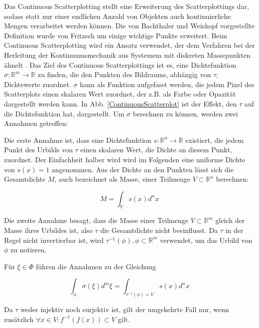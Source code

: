 \documentclass[a4paper,fontsize=12pt,toc=bib,halfparskip]{scrartcl}
\begin{document}
Das Continuous Scatterplotting stellt eine Erweiterung des Scatterplottings dar, sodass statt nur einer endlichen Anzahl von Objekten auch kontinuierliche Mengen verarbeitet werden k\"onnen. Die von Bachthaler und Weiskopf\cite{bachthaler2008continuous} vorgestellte Definition wurde von Fritzsch\cite{fritzsch2016continuousScatterplot} um einige wichtige Punkte erweitert. Beim Continuous Scatterplotting wird ein Ansatz verwendet, der dem Verfahren bei der Herleitung der Kontinuumsmechanik aus Systemem mit diskreten Massepunkten \"ahnelt \cite[S.~1429]{bachthaler2008continuous}. Das Ziel des Continuous Scatterplottings ist es, eine Dichtefunktion $\sigma: \mathbb{R}^m \rightarrow \mathbb{R}$ zu finden, die den Punkten des Bildraums, abh\"angig von $\tau$, Dichtewerte zuordnet. $\sigma$ kann als Funktion aufgefasst werden, die jedem Pixel des Scatterplots einen skalaren Wert zuordnet, der z.B. als Farbe oder Opazit\"at dargestellt werden kann. In Abb. \ref{ContinuousScatterplot} ist der Effekt, den $\tau$ auf die Dichtefunktion hat, dargestellt. Um $\sigma$ berechnen zu k\"onnen, werden zwei Annahmen getroffen:

Die erste Annahme ist, dass eine Dichtefunktion $s: \mathbb{R}^n \rightarrow \mathbb{R}$ existiert, die jedem Punkt des Urbilds von $\tau$ einen skalaren Wert, die Dichte an diesem Punkt, zuordnet. Der Einfachheit halber wird wird im Folgenden eine uniforme Dichte von $s(x) = 1$ angenommen. Aus der Dichte an den Punkten l\"asst sich die Gesamtdichte $M$, auch bezeichnet als Masse, einer Teilmenge $V\subset\mathbb{R}^n$ berechnen:

\begin{equation}
M = \int_{V}s(x)d^nx
\label{Dichtefunktion}
\end{equation}

Die zweite Annahme besagt, dass die Masse einer Teilmenge $V\subset\mathbb{R}^m$ gleich der Masse ihres Urbildes ist, also $\tau$ die Gesamtdichte nicht beeinflusst. Da $\tau$ in der Regel nicht invertierbar ist, wird $\tau^{-1}(\phi), \phi \subset \mathbb{R}^m$ verwendet, um das Urbild von $\phi$ zu notieren. 


F\"ur $\xi \in \Phi$ f\"uhren die Annahmen zu der Gleichung

\begin{equation}
\int_{\phi}\sigma(\xi)d^m\xi = \int_{\tau^{-1}(\phi) = V}s(x)d^nx
\end{equation}

Da $\tau$ weder injektiv noch surjektiv ist, gilt der umgekehrte Fall nur, wenn zus\"atzlich $\forall x \in V: f^{-1}(f(x)) \subset V$ gilt\cite [S.~20]{fritzsch2016continuousScatterplot}.
\end{document}
